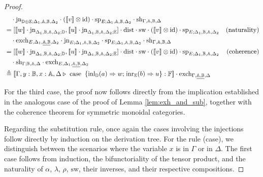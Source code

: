 \documentclass[10pt,a4paper]{amsart}
\theoremstyle{definition}
\theoremstyle{definition}
\theoremstyle{definition}
\theoremstyle{definition}
\theoremstyle{definition}
\theoremstyle{definition}
\begin{document}
\begin{proof}
\begin{align*}
  & \hspace{10pt} \cdot  \text{jn}_{\typeD \oplus\typeE;\Delta_{1},\typeA,\typeB,  \Delta_{2}} \cdot ([\![  v  ]\!] \otimes \text{id})  \cdot\text{sp}_{E; \Delta_{1},\typeA,\typeB,  \Delta_{2}} \cdot \text{sh}_{\Gamma,\typeA, \typeB,\Delta} \\
  & = [[\![ w ]\!] \cdot \text{jn}_{\Delta_{1} ,\typeB,\typeA,  \Delta_{2};\typeD},  [\![u ]\!] \cdot \text{jn}_{\Delta_{1} ,\typeB,\typeA,  \Delta_{2};\typeE}] \cdot \text{dist} \cdot \text{sw} \cdot ([\![  v  ]\!] \otimes \text{id}) \cdot \text{sp}_{E;\Delta_{1}, \typeB, \typeA, \Delta_{2}} & {\text{(naturality)}} \\
  & \hspace{10pt}  \cdot  \text{exch}_{E, \Delta_{1},\underline{\typeA,\typeB},  \Delta_{2}} \cdot  \text{jn}_{E ;\Delta_{1},\typeA,\typeB,  \Delta_{2}}   \cdot\text{sp}_{E; \Delta_{1},\typeA,\typeB,  \Delta_{2}} \cdot \text{sh}_{\Gamma,\typeA, \typeB,\Delta} \\
  & = [[\![ w ]\!] \cdot \text{jn}_{\Delta_{1} ,\typeB,\typeA,  \Delta_{2};\typeD},  [\![u ]\!] \cdot \text{jn}_{\Delta_{1} ,\typeB,\typeA,  \Delta_{2};\typeE}] \cdot \text{dist} \cdot \text{sw} \cdot ([\![  v  ]\!] \otimes \text{id}) \cdot \text{sp}_{E; \Delta_{1}, \typeB,\typeA,  \Delta_{2}} & {\text{(coherence)}} \\
  & \hspace{10pt} \cdot  \text{sh}_{\Gamma; \typeB,\typeA, \Delta} \cdot  \text{exch}_{E, \Delta_{1},\underline{\typeA,\typeB},  \Delta_{2}} \\
  & \triangleq [\![\Gamma,y:\typeB, x:\typeA, \Delta \vljud \text{ case }  \hspace{2pt}  \{\text{inl}_{\typeD} (a) \Rightarrow w ; \hspace{1pt} \text{inr}_{\typeE} (b) \Rightarrow u\}: \typeF]\!] \cdot \text{exch}_{\Gamma,\underline{\typeA,  \typeB}, \Delta}
\end{align*}



For the third case, the proof now follows directly from the implication established in the analogous case of the proof of Lemma \ref{lem:exh_and_sub}, together with the coherence theorem for symmetric monoidal categories.

Regarding the substitution rule, once again the cases involving the injections follow directly by induction on the derivation tree. For the rule (case), we distinguish between the scenarios where the variable $x$ is in $\Gamma$ or in $\Delta$. The first case follows from induction, the bifunctoriality of the tensor product, and the naturality of $\alpha$, $\lambda$, $\rho$, $\text{sw}$, their inverses, and their respective compositions.


\end{proof}
\end{document}
